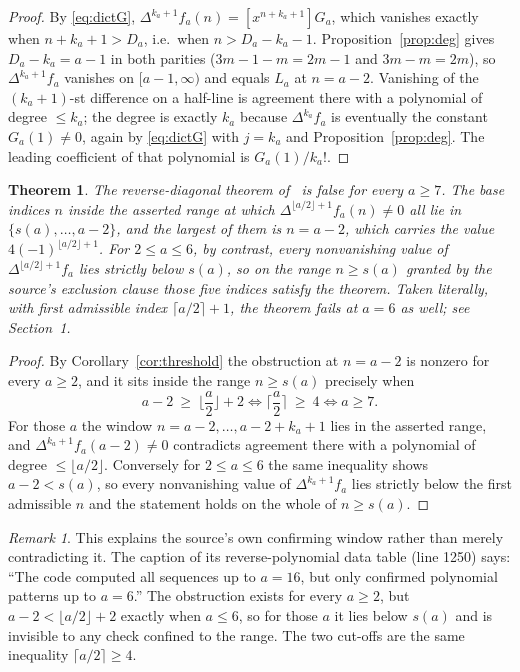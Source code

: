\documentclass[11pt]{amsart}
\newtheorem{theorem}{Theorem}
\theoremstyle{remark}
\newtheorem*{remark}{Remark}
\begin{document}
\begin{proof}
By \eqref{eq:dictG}, $\Delta^{k_a+1}f_a(n)=[x^{n+k_a+1}]G_a$, which vanishes
exactly when $n+k_a+1>D_a$, i.e.\ when $n>D_a-k_a-1$. Proposition~\ref{prop:deg}
gives $D_a-k_a=a-1$ in both parities ($3m-1-m=2m-1$ and $3m-m=2m$), so
$\Delta^{k_a+1}f_a$ vanishes on $[a-1,\infty)$ and equals $L_a$ at $n=a-2$.
Vanishing of the $(k_a+1)$-st difference on a half-line is agreement there with
a polynomial of degree $\le k_a$; the degree is exactly $k_a$ because
$\Delta^{k_a}f_a$ is eventually the constant $G_a(1)\ne0$, again
by \eqref{eq:dictG} with $j=k_a$ and Proposition~\ref{prop:deg}. The leading
coefficient of that polynomial is $G_a(1)/k_a!$.
\end{proof}

\begin{theorem}\label{thm:family}
The reverse-diagonal theorem of~\cite{CHOPTY} is false for every $a\ge7$. The
base indices $n$ inside the asserted range at which
$\Delta^{\lfloor a/2\rfloor+1}f_a(n)\ne0$ all lie in $\{s(a),\dots,a-2\}$, and
the largest of them is $n=a-2$, which carries the value
$4(-1)^{\lfloor a/2\rfloor+1}$. For $2\le a\le 6$, by contrast, every
nonvanishing value of $\Delta^{\lfloor a/2\rfloor+1}f_a$ lies strictly below
$s(a)$, so on the range $n\ge s(a)$ granted by the source's exclusion clause
those five indices satisfy the theorem. Taken literally, with first admissible
index $\lceil a/2\rceil+1$, the theorem fails at $a=6$ as well; see Section~1.
\end{theorem}

\begin{proof}
By Corollary~\ref{cor:threshold} the obstruction at $n=a-2$ is nonzero for
every $a\ge2$, and it sits inside the range $n\ge s(a)$ precisely when
\[
  a-2\ \ge\ \Big\lfloor\frac a2\Big\rfloor+2
  \iff \Big\lceil\frac a2\Big\rceil\ \ge\ 4
  \iff a\ge 7 .
\]
For those $a$ the window $n=a-2,\dots,a-2+k_a+1$ lies in the asserted range,
and $\Delta^{k_a+1}f_a(a-2)\ne0$ contradicts agreement there with a polynomial
of degree $\le\lfloor a/2\rfloor$. Conversely for $2\le a\le6$ the same
inequality shows $a-2<s(a)$, so every nonvanishing value of
$\Delta^{k_a+1}f_a$ lies strictly below the first admissible $n$ and the
statement holds on the whole of $n\ge s(a)$.
\end{proof}

\begin{remark}
This explains the source's own confirming window rather than merely
contradicting it. The caption of its reverse-polynomial data table (line 1250)
says: ``The code computed all sequences up to $a=16$, but only confirmed
polynomial patterns up to $a=6$.'' The obstruction exists for every $a\ge2$,
but $a-2<\lfloor a/2\rfloor+2$ exactly when $a\le6$, so for those $a$ it lies
below $s(a)$ and is invisible to any check confined to the range. The two
cut-offs are the same inequality $\lceil a/2\rceil\ge4$.
\end{remark}
\end{document}
